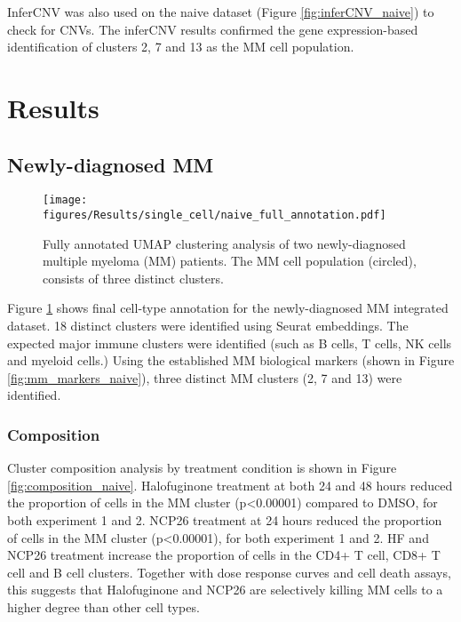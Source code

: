 InferCNV was also used on the naive dataset (Figure \ref{fig:inferCNV_naive}) to check for CNVs.
The inferCNV results confirmed the gene expression-based identification of clusters 2, 7 and 13 as the MM cell population.

\clearpage
\section{Results}

\subsection{Newly-diagnosed MM}


\begin{figure}[hpt]
\centering
\texttt{[image: figures/Results/single\_cell/naive\_full\_annotation.pdf]}
\caption[Newly-diagnosed MM scRNA-seq full annotation]{Fully annotated UMAP clustering analysis of two newly-diagnosed multiple myeloma (MM) patients.
The MM cell population (circled), consists of three distinct clusters.}
\label{fig:full_anno_naive}
\end{figure}

Figure \ref{fig:full_anno_naive} shows final cell-type annotation for the newly-diagnosed MM integrated dataset.
18 distinct clusters were identified using Seurat embeddings.
The expected major immune clusters were identified (such as B cells, T cells, NK cells and myeloid cells.)
Using the established MM biological markers (shown in Figure \ref{fig:mm_markers_naive}), three distinct MM clusters (2, 7 and 13) were identified.

\subsubsection{Composition}
Cluster composition analysis by treatment condition is shown in Figure \ref{fig:composition_naive}.
Halofuginone treatment at both 24 and 48 hours reduced the proportion of cells in the MM cluster (p<0.00001) compared to DMSO, for both experiment 1 and 2.
NCP26 treatment at 24 hours reduced the proportion of cells in the MM cluster (p<0.00001), for both experiment 1 and 2.
HF and NCP26 treatment increase the proportion of cells in the CD4+ T cell, CD8+ T cell and B cell clusters.
Together with dose response curves and cell death assays, this suggests that Halofuginone and NCP26 are selectively killing MM cells to a higher degree than other cell types.


